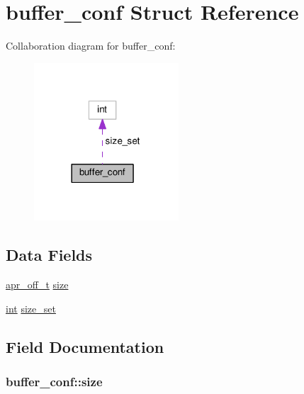 \hypertarget{structbuffer__conf}{}\section{buffer\+\_\+conf Struct Reference}
\label{structbuffer__conf}


Collaboration diagram for buffer\+\_\+conf\+:
\nopagebreak
\begin{figure}[H]
\begin{center}
\leavevmode
\includegraphics[width=153pt]{structbuffer__conf__coll__graph}
\end{center}
\end{figure}
\subsection*{Data Fields}
\begin{DoxyCompactItemize}
\item 
\hyperlink{group__apr__platform_ga6938af9075cec15c88299109381aa984}{apr\+\_\+off\+\_\+t} \hyperlink{structbuffer__conf_a2f14c0d93ae672583340b797ee3f98d0}{size}
\item 
\hyperlink{pcre_8txt_a42dfa4ff673c82d8efe7144098fbc198}{int} \hyperlink{structbuffer__conf_a48a6ff9dfa80198954128a6c773a68db}{size\+\_\+set}
\end{DoxyCompactItemize}


\subsection{Field Documentation}
\subsubsection[{\texorpdfstring{size}{size}}]{ buffer\+\_\+conf\+::size}\hypertarget{structbuffer__conf_a2f14c0d93ae672583340b797ee3f98d0}{}\label{structbuffer__conf_a2f14c0d93ae672583340b797ee3f98d0}
